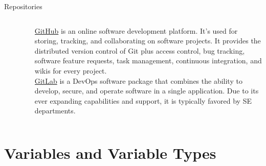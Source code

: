 \documentclass[pdf]{beamer}
\theoremstyle{remark}
\theoremstyle{definition}
\begin{document}
\begin{frame}[t]{Repositories}
\begin{columns}[T]
\begin{column}{0.2\textwidth}
\begin{figure}[htbp]
  \captionsetup{justification=centering}
  \includegraphics[height=1.2cm, trim=0.1cm 0.1cm 0.1cm 0.1cm width=1.2cm]{Images/Github.png}
\end{figure}
\vspace{12.0ex}
\begin{figure}[htbp]
  \captionsetup{justification=centering}
  \includegraphics[height=0.9cm, trim=0.1cm 0.1cm 0.1cm 0.1cm width=0.9cm]{Images/Gitlab.png}
\end{figure}
\end{column}
\begin{column}{0.7\textwidth}  %
\href{https://github.com/}{GitHub} is an online software development platform. It's used for storing, tracking, and collaborating on software projects. It provides the distributed version control of Git plus access control, bug tracking, software feature requests, task management, continuous integration, and wikis for every project.%
 \\
\vspace{1.5ex}
\href{https://about.gitlab.com/}{GitLab} is a DevOps software package that combines the ability to develop, secure, and operate software in a single application.  Due to its ever expanding capabilities and support, it is typically favored by SE departments.  
\end{column}
\end{columns}
\end{frame}

\section{Variables and Variable Types}
\end{document}
